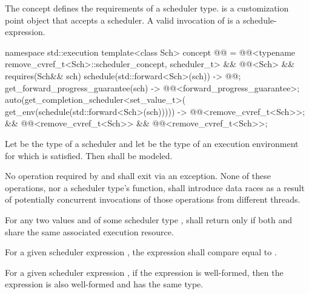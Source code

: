 \pnum
The  concept defines
the requirements of a scheduler type.
 is a customization point object
that accepts a scheduler.
A valid invocation of  is a schedule-expression.
\begin{codeblock}
namespace std::execution {
  template<class Sch>
    concept @@ =
      @@<typename remove_cvref_t<Sch>::scheduler_concept, scheduler_t> &&
      @@<Sch> &&
      requires(Sch&& sch) {
        { schedule(std::forward<Sch>(sch)) } -> @@;
        { get_forward_progress_guarantee(sch) } -> @@<forward_progress_guarantee>;
        { auto(get_completion_scheduler<set_value_t>(
            get_env(schedule(std::forward<Sch>(sch))))) }
              -> @@<remove_cvref_t<Sch>>;
      } &&
      @@<remove_cvref_t<Sch>> &&
      @@<remove_cvref_t<Sch>>;
}
\end{codeblock}

\pnum
Let  be the type of a scheduler and
let  be the type of an execution environment
for which 
is satisfied.
Then 
shall be modeled.

\pnum
No operation required by
 and
shall exit via an exception.
None of these operations,
nor a scheduler type's  function,
shall introduce data races
as a result of potentially concurrent invocations
of those operations from different threads.

\pnum
For any two values  and 
of some scheduler type ,
 shall return 
only if both  and  share
the same associated execution resource.

\pnum
For a given scheduler expression ,
the expression
shall compare equal to .

\pnum
For a given scheduler expression ,
if the expression  is well-formed,
then the expression 
is also well-formed and has the same type.

